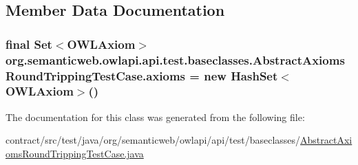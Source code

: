 \subsection{Member Data Documentation}
\hypertarget{classorg_1_1semanticweb_1_1owlapi_1_1api_1_1test_1_1baseclasses_1_1_abstract_axioms_round_tripping_test_case_add68142ec0b0cf9d63a6c12280b7275b}{
\subsubsection[{axioms}]{\setlength{\rightskip}{0pt plus 5cm}final Set$<${\bf O\-W\-L\-Axiom}$>$ org.\-semanticweb.\-owlapi.\-api.\-test.\-baseclasses.\-Abstract\-Axioms\-Round\-Tripping\-Test\-Case.\-axioms = new Hash\-Set$<${\bf O\-W\-L\-Axiom}$>$()\hspace{0.3cm}{\ttfamily [private]}}}\label{classorg_1_1semanticweb_1_1owlapi_1_1api_1_1test_1_1baseclasses_1_1_abstract_axioms_round_tripping_test_case_add68142ec0b0cf9d63a6c12280b7275b}


The documentation for this class was generated from the following file\-:\begin{DoxyCompactItemize}
\item 
contract/src/test/java/org/semanticweb/owlapi/api/test/baseclasses/\hyperlink{_abstract_axioms_round_tripping_test_case_8java}{Abstract\-Axioms\-Round\-Tripping\-Test\-Case.\-java}\end{DoxyCompactItemize}
